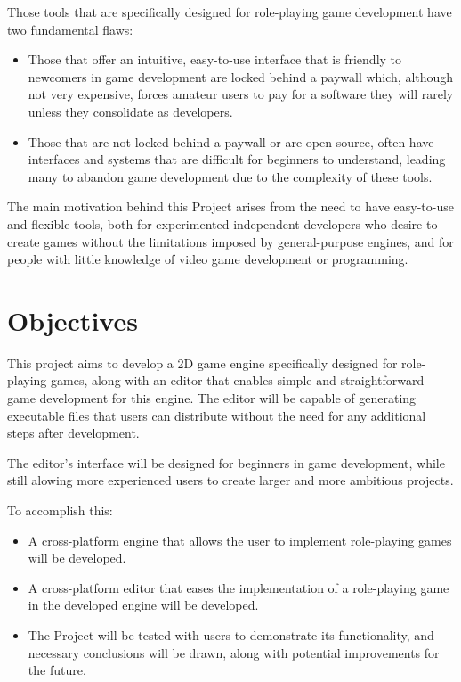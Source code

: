 Those tools that are specifically designed for role-playing game development have two fundamental flaws:
\begin{itemize}
	\item Those that offer an intuitive, easy-to-use interface that is friendly to newcomers in game development are locked behind a paywall which, although not very expensive, forces amateur users to pay for a software they will rarely unless they consolidate as developers.
	\item Those that are not locked behind a paywall or are open source, often have interfaces and systems that are difficult for beginners to understand, leading many to abandon game development due to the complexity of these tools.
\end{itemize}

\medskip

The main motivation behind this Project arises from the need to have easy-to-use and flexible tools, both for experimented independent developers who desire to create games without the limitations imposed by general-purpose engines, and for people with little knowledge of video game development or programming.

\section*{Objectives}
This project aims to develop a 2D game engine specifically designed for role-playing games, along with an editor that enables simple and straightforward game development for this engine. The editor will be capable of generating executable files that users can distribute without the need for any additional steps after development.

\smallskip

The editor's interface will be designed for beginners in game development, while still alowing more experienced users to create larger and more ambitious projects.

\medskip

To accomplish this:
\begin{itemize}
	\item A cross-platform engine that allows the user to implement role-playing games will be developed.
	\item A cross-platform editor that eases the implementation of a role-playing game in the developed engine will be developed.
	\item The Project will be tested with users to demonstrate its functionality, and necessary conclusions will be drawn, along with potential improvements for the future.
\end{itemize}

